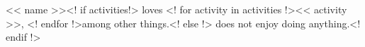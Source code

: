 \documentclass{article}
\begin{document}
<< name >><! if activities!> loves <! for activity in activities !><< activity >>, <! endfor !>among other things.<! else !> does not enjoy doing anything.<! endif !>
\end{document}
